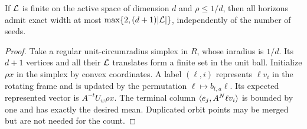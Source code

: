 \begin{proposition}\label{prop:simplex-tracker45}
If $\mathcal L$ is finite on the active space of dimension $d$ and $\rho\le1/d$, then all horizons admit exact width at most
$\max\{2,(d+1)|\mathcal L|\}$, independently of the number of seeds.
\end{proposition}
\begin{proof}
Take a regular unit-circumradius simplex in $R$, whose inradius is $1/d$. Its $d+1$ vertices and all their $\mathcal L$ translates form a finite set in the unit ball. Initialize $\rho x$ in the simplex by convex coordinates. A label $(\ell,i)$ represents $\ell v_i$ in the rotating frame and is updated by the permutation $\ell\mapsto b_{t,a}\ell$. Its expected represented vector is $A^{-t}U_w\rho x$. The terminal column $\langle e_j,A^N\ell v_i\rangle$ is bounded by one and has exactly the desired mean. Duplicated orbit points may be merged but are not needed for the count.
\end{proof}
